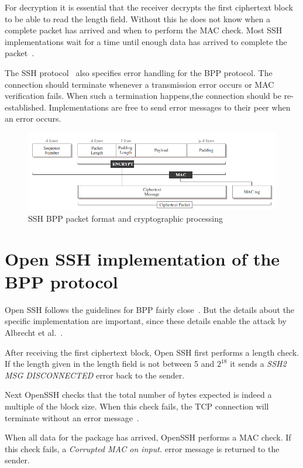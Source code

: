 \documentclass[twocolumn]{article}
\begin{document}
\indent For decryption it is essential that the receiver decrypts the first ciphertext block to be able to read the length field. Without this he does not know when a complete packet has arrived and when to perform the MAC check. Most SSH implementations wait for a time until enough data has arrived to complete the packet~\cite{Albrecht2009}.

\indent The SSH protocol~\cite{Ylonen2006} also specifies error handling for the BPP protocol. The connection should terminate whenever a transmission error occurs or MAC verification fails. When such a termination happens,the connection should be re-established. Implementations are free to send error messages to their peer when an error occurs.

\begin{figure}
	  \centering
    	\includegraphics[scale=.6]{SSHBPP.png}
	\caption{SSH BPP packet format and cryptographic processing~\cite{Albrecht2009}}
	\label{fig:BPPProtocol}
\end{figure}

\section{Open SSH implementation of the BPP protocol}

\indent Open SSH follows the guidelines for BPP fairly close~\cite{Albrecht2009}. But the details about the specific implementation are important, since these details enable the attack by Albrecht et al.~\cite{Albrecht2009}.

\indent After receiving the first ciphertext block, Open SSH first performs a length check. If the length given in the length field is not between 5 and $2^{18}$ it sends a \textit{SSH2 MSG DISCONNECTED} error back to the sender.

\indent Next OpenSSH checks that the total number of bytes expected is indeed a multiple of the block size. When this check fails, the TCP connection will terminate without an error message~\cite{Albrecht2009}.

\indent When all data for the package has arrived, OpenSSH performs a MAC check. If this check fails, a \textit{Corrupted MAC on input.} error message is returned to the sender.
\end{document}
